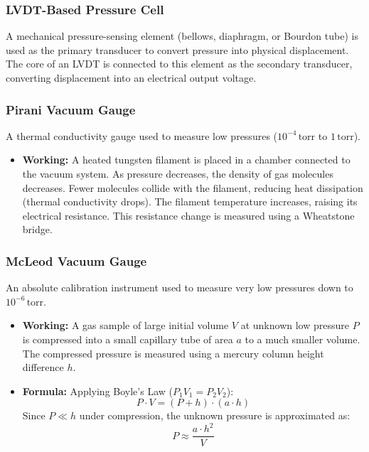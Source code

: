 \documentclass[12pt,a4paper]{article}
\begin{document}
\subsubsection{LVDT-Based Pressure Cell}
A mechanical pressure-sensing element (bellows, diaphragm, or Bourdon tube) is used as the primary transducer to convert pressure into physical displacement. The core of an LVDT is connected to this element as the secondary transducer, converting displacement into an electrical output voltage.

\subsubsection{Pirani Vacuum Gauge}
A thermal conductivity gauge used to measure low pressures ($10^{-4}\,\text{torr}$ to $1\,\text{torr}$).
\begin{itemize}[leftmargin=*, itemsep=3pt]
  \item \textbf{Working:} A heated tungsten filament is placed in a chamber connected to the vacuum system. As pressure decreases, the density of gas molecules decreases. Fewer molecules collide with the filament, reducing heat dissipation (thermal conductivity drops). The filament temperature increases, raising its electrical resistance. This resistance change is measured using a Wheatstone bridge.
\end{itemize}


\subsubsection{McLeod Vacuum Gauge}
An absolute calibration instrument used to measure very low pressures down to $10^{-6}\,\text{torr}$.
\begin{itemize}[leftmargin=*, itemsep=3pt]
  \item \textbf{Working:} A gas sample of large initial volume $V$ at unknown low pressure $P$ is compressed into a small capillary tube of area $a$ to a much smaller volume. The compressed pressure is measured using a mercury column height difference $h$.
  \item \textbf{Formula:} Applying Boyle's Law ($P_1 V_1 = P_2 V_2$):
  \begin{equation}
    P \cdot V = (P + h) \cdot (a \cdot h)
  \end{equation}
  Since $P \ll h$ under compression, the unknown pressure is approximated as:
  \begin{equation}
    P \approx \frac{a \cdot h^2}{V}
  \end{equation}
\end{itemize}
\end{document}
